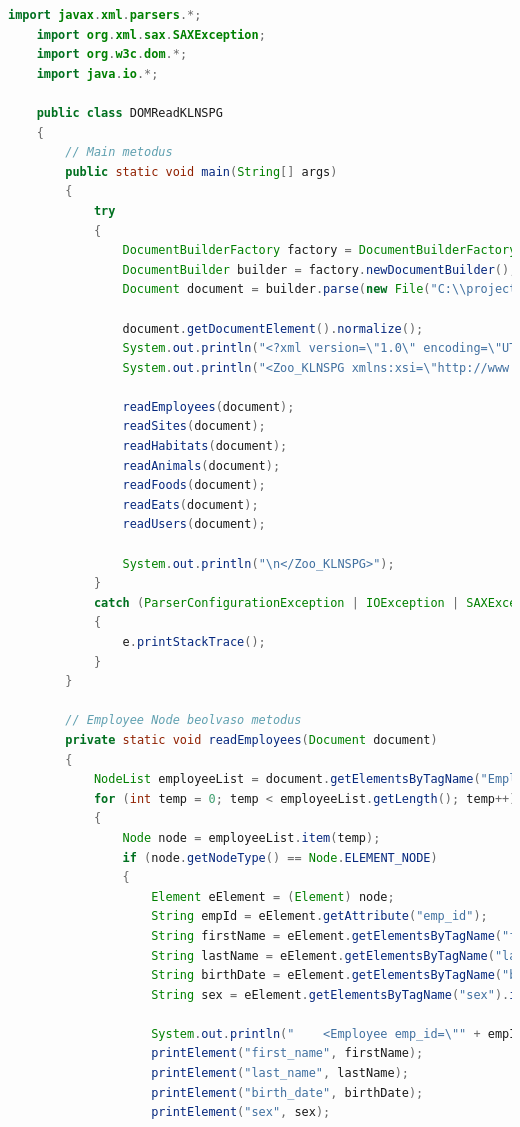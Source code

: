 \documentclass[12pt]{report}
\begin{document}
\begin{lstlisting}[caption={DOMReadKLNSPG.java} adatolvasó program, language=Java]
	import javax.xml.parsers.*;
	import org.xml.sax.SAXException;
	import org.w3c.dom.*;
	import java.io.*;
	
	public class DOMReadKLNSPG
	{
		// Main metodus
		public static void main(String[] args) 
		{
			try 
			{
				DocumentBuilderFactory factory = DocumentBuilderFactory.newInstance();
				DocumentBuilder builder = factory.newDocumentBuilder();
				Document document = builder.parse(new File("C:\\projects\\KLNSPG_XMLGyak\\XMLTaskKLNSPG\\XMLKLNSPG.xml"));
				
				document.getDocumentElement().normalize();
				System.out.println("<?xml version=\"1.0\" encoding=\"UTF-8\"?>\n");
				System.out.println("<Zoo_KLNSPG xmlns:xsi=\"http://www.w3.org/2001/XMLSchema-instance\" xsi:noNamespaceSchemaLocation=\"XMLSchemaKLNSPG.xsd\">\n");
				
				readEmployees(document);
				readSites(document);
				readHabitats(document);
				readAnimals(document);
				readFoods(document);
				readEats(document);
				readUsers(document);
				
				System.out.println("\n</Zoo_KLNSPG>");
			} 
			catch (ParserConfigurationException | IOException | SAXException e)
			{
				e.printStackTrace();
			}
		}
		
		// Employee Node beolvaso metodus
		private static void readEmployees(Document document) 
		{
			NodeList employeeList = document.getElementsByTagName("Employee");
			for (int temp = 0; temp < employeeList.getLength(); temp++) 
			{
				Node node = employeeList.item(temp);
				if (node.getNodeType() == Node.ELEMENT_NODE) 
				{
					Element eElement = (Element) node;
					String empId = eElement.getAttribute("emp_id");
					String firstName = eElement.getElementsByTagName("first_name").item(0).getTextContent();
					String lastName = eElement.getElementsByTagName("last_name").item(0).getTextContent();
					String birthDate = eElement.getElementsByTagName("birth_date").item(0).getTextContent();
					String sex = eElement.getElementsByTagName("sex").item(0).getTextContent();
					
					System.out.println("    <Employee emp_id=\"" + empId + "\">");
					printElement("first_name", firstName);
					printElement("last_name", lastName);
					printElement("birth_date", birthDate);
					printElement("sex", sex);
					

\end{lstlisting}
\end{document}
